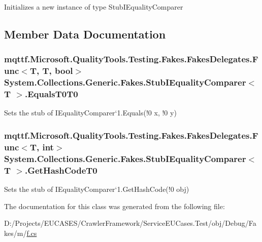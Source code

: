 Initializes a new instance of type Stub\-I\-Equality\-Comparer



\subsection{Member Data Documentation}
\hypertarget{class_system_1_1_collections_1_1_generic_1_1_fakes_1_1_stub_i_equality_comparer_3_01_t_01_4_a76f3082b8f690ba90a0577f47662e69c}{
\subsubsection[{Equals\-T0\-T0}]{\setlength{\rightskip}{0pt plus 5cm}mqttf.\-Microsoft.\-Quality\-Tools.\-Testing.\-Fakes.\-Fakes\-Delegates.\-Func$<$T, T, bool$>$ System.\-Collections.\-Generic.\-Fakes.\-Stub\-I\-Equality\-Comparer$<$ T $>$.Equals\-T0\-T0}}\label{class_system_1_1_collections_1_1_generic_1_1_fakes_1_1_stub_i_equality_comparer_3_01_t_01_4_a76f3082b8f690ba90a0577f47662e69c}


Sets the stub of I\-Equality\-Comparer`1.Equals(!0 x, !0 y)

\hypertarget{class_system_1_1_collections_1_1_generic_1_1_fakes_1_1_stub_i_equality_comparer_3_01_t_01_4_a1d4f4779cbd1705d7d3a6cad526df6aa}{
\subsubsection[{Get\-Hash\-Code\-T0}]{\setlength{\rightskip}{0pt plus 5cm}mqttf.\-Microsoft.\-Quality\-Tools.\-Testing.\-Fakes.\-Fakes\-Delegates.\-Func$<$T, int$>$ System.\-Collections.\-Generic.\-Fakes.\-Stub\-I\-Equality\-Comparer$<$ T $>$.Get\-Hash\-Code\-T0}}\label{class_system_1_1_collections_1_1_generic_1_1_fakes_1_1_stub_i_equality_comparer_3_01_t_01_4_a1d4f4779cbd1705d7d3a6cad526df6aa}


Sets the stub of I\-Equality\-Comparer`1.Get\-Hash\-Code(!0 obj)



The documentation for this class was generated from the following file\-:\begin{DoxyCompactItemize}
\item 
D\-:/\-Projects/\-E\-U\-C\-A\-S\-E\-S/\-Crawler\-Framework/\-Service\-E\-U\-Cases.\-Test/obj/\-Debug/\-Fakes/m/\hyperlink{m_2f_8cs}{f.\-cs}\end{DoxyCompactItemize}
